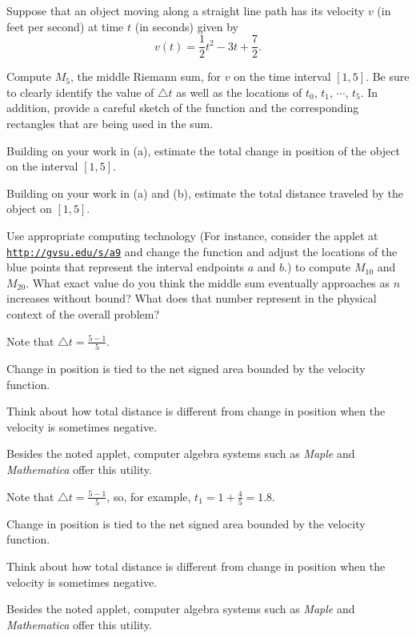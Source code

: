 \begin{activity} \label{A:4.2.3}  Suppose that an object moving along a straight line path has its velocity $v$ (in feet per second) at time $t$ (in seconds) given by 
\[ v(t) = \frac{1}{2}t^2 - 3t + \frac{7}{2}. \]
\ba
\item Compute $M_5$, the middle Riemann sum, for $v$ on the time interval $[1,5]$.  Be sure to clearly identify the value of $\triangle t$ as well as the locations of $t_0$, $t_1$, $\cdots$, $t_5$.  In addition, provide a careful sketch of the function and the corresponding rectangles that are being used in the sum.

\item Building on your work in (a), estimate the total change in position of the object on the interval $[1,5]$.

\item Building on your work in (a) and (b), estimate the total distance traveled by the object on $[1,5]$.

\item Use appropriate computing technology (For instance, consider the applet at \href{http://gvsu.edu/s/a9}{\texttt{http://gvsu.edu/s/a9}} and change the function and adjust the locations of the blue points that represent the interval endpoints $a$ and $b$.) to compute $M_{10}$ and $M_{20}$.  What exact value do you think the middle sum eventually approaches as $n$ increases without bound?  What does that number represent in the physical context of the overall problem?
	
\ea
\end{activity}
\begin{smallhint}
\ba
	\item Note that $\triangle t = \frac{5-1}{5}$.
	\item Change in position is tied to the net signed area bounded by the velocity function.
	\item Think about how total distance is different from change in position when the velocity is sometimes negative.
	\item Besides the noted applet, computer algebra systems such as \emph{Maple} and \emph{Mathematica} offer this utility.
\ea
\end{smallhint}
\begin{bighint}
\ba
	\item Note that $\triangle t = \frac{5-1}{5}$, so, for example, $t_1 = 1 + \frac{4}{5} = 1.8$.
	\item Change in position is tied to the net signed area bounded by the velocity function.
	\item Think about how total distance is different from change in position when the velocity is sometimes negative.
	\item Besides the noted applet, computer algebra systems such as \emph{Maple} and \emph{Mathematica} offer this utility.
\ea
\end{bighint}
